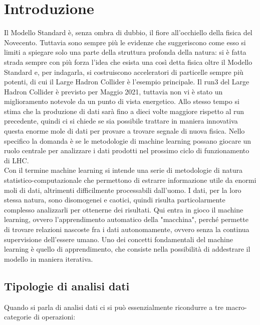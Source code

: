 %
\section{Introduzione}
\label{sec:introduzione}
%
Il Modello Standard è, senza ombra di dubbio, il fiore all'occhiello della fisica del Novecento. Tuttavia sono sempre più le evidenze che suggeriscono come esso si limiti a spiegare solo una parte della struttura profonda della natura: si è fatta strada sempre con più forza l'idea che esista una così detta fisica oltre il Modello Standard e, per indagarla, si costruiscono acceleratori di particelle sempre più potenti, di cui il Large Hadron Collider è l'esempio principale. 
Il run3 del Large Hadron Collider è previsto per Maggio 2021, tuttavia non vi è stato un miglioramento notevole da un punto di vista energetico. Allo stesso tempo si stima che la produzione di dati sarà fino a dieci volte maggiore rispetto al run precedente, quindi ci si chiede se sia possibile trattare in maniera innovativa questa enorme mole di dati per provare a trovare segnale di nuova fisica. Nello specifico la domanda è se le metodologie di machine learning possano giocare un ruolo centrale per analizzare i dati prodotti nel prossimo ciclo di funzionamento di LHC.\\
Con il termine machine learning si intende una serie di metodologie di natura statistico-computazionale che permettono di estrarre informazione utile da enormi moli di dati, altrimenti difficilmente processabili dall'uomo.
I dati, per la loro stessa natura, sono disomogenei e caotici, quindi risulta particolarmente complesso analizzarli per ottenerne dei risultati. Qui entra in gioco il machine learning, ovvero l'apprendimento automatico della "macchina", perché permette di trovare relazioni nascoste fra i dati autonomamente, ovvero senza la continua supervisione dell'essere umano. Uno dei concetti fondamentali del machine learning è quello di apprendimento, che consiste nella possibilità di addestrare il modello in maniera iterativa. \\

\newpage


\subsection{Tipologie di analisi dati}
\label{subsec:tipologie analisi dati}

	Quando si parla di analisi dati ci si può essenzialmente ricondurre a tre macro-categorie di operazioni:
	
